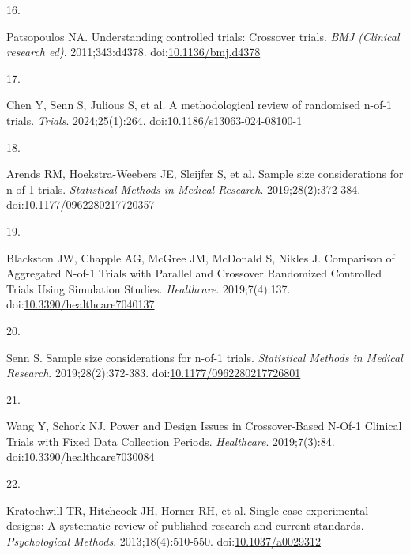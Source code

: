 \documentclass[
  11pt,
]{article}
\newlength{\cslhangindent}
\newlength{\csllabelwidth}
\newenvironment{CSLReferences}[2] %
 {\begin{list}{}{%
  \setlength{\itemindent}{0pt}
  \setlength{\leftmargin}{0pt}
  \setlength{\parsep}{0pt}
  \ifodd #1
   \setlength{\leftmargin}{\cslhangindent}
   \setlength{\itemindent}{-1\cslhangindent}
  \fi
  \setlength{\itemsep}{#2\baselineskip}}}
 {\end{list}}
\newcommand{\CSLLeftMargin}[1]{\parbox[t]{\csllabelwidth}{\strut#1\strut}}
\newcommand{\CSLRightInline}[1]{\parbox[t]{\linewidth - \csllabelwidth}{\strut#1\strut}}
\begin{document}
\begin{CSLReferences}{0}{1}
\CSLLeftMargin{16. }%
\CSLRightInline{Patsopoulos NA. Understanding controlled trials:
{Crossover} trials. \emph{BMJ (Clinical research ed)}. 2011;343:d4378.
doi:\href{https://doi.org/10.1136/bmj.d4378}{10.1136/bmj.d4378}}

\CSLLeftMargin{17. }%
\CSLRightInline{{Chen Y, Senn S, Julious S, et al.} A methodological
review of randomised n-of-1 trials. \emph{Trials}. 2024;25(1):264.
doi:\href{https://doi.org/10.1186/s13063-024-08100-1}{10.1186/s13063-024-08100-1}}

\CSLLeftMargin{18. }%
\CSLRightInline{{Arends RM, Hoekstra-Weebers JE, Sleijfer S, et al.}
Sample size considerations for n-of-1 trials. \emph{Statistical Methods
in Medical Research}. 2019;28(2):372-384.
doi:\href{https://doi.org/10.1177/0962280217720357}{10.1177/0962280217720357}}

\CSLLeftMargin{19. }%
\CSLRightInline{Blackston JW, Chapple AG, McGree JM, McDonald S, Nikles
J. Comparison of {Aggregated N-of-1 Trials} with {Parallel} and
{Crossover Randomized Controlled Trials Using Simulation Studies}.
\emph{Healthcare}. 2019;7(4):137.
doi:\href{https://doi.org/10.3390/healthcare7040137}{10.3390/healthcare7040137}}

\CSLLeftMargin{20. }%
\CSLRightInline{Senn S. Sample size considerations for n-of-1 trials.
\emph{Statistical Methods in Medical Research}. 2019;28(2):372-383.
doi:\href{https://doi.org/10.1177/0962280217726801}{10.1177/0962280217726801}}

\CSLLeftMargin{21. }%
\CSLRightInline{Wang Y, Schork NJ. Power and {Design Issues} in
{Crossover-Based N-Of-1 Clinical Trials} with {Fixed Data Collection
Periods}. \emph{Healthcare}. 2019;7(3):84.
doi:\href{https://doi.org/10.3390/healthcare7030084}{10.3390/healthcare7030084}}

\CSLLeftMargin{22. }%
\CSLRightInline{{Kratochwill TR, Hitchcock JH, Horner RH, et al.}
Single-case experimental designs: {A} systematic review of published
research and current standards. \emph{Psychological Methods}.
2013;18(4):510-550.
doi:\href{https://doi.org/10.1037/a0029312}{10.1037/a0029312}}


\end{CSLReferences}
\end{document}
